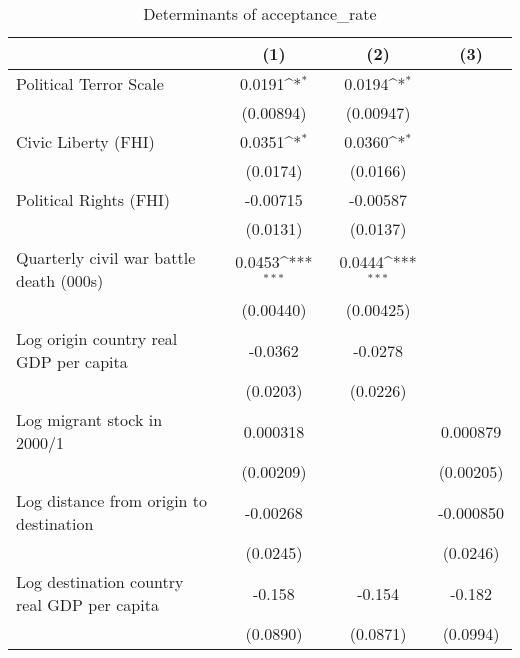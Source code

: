\begin{table}[htbp]\centering
\def\sym#1{\ifmmode^{#1}\else\(^{#1}\)\fi}
\caption{Determinants of acceptance\_rate}
\begin{tabular}{l*{3}{c}}
\hline\hline
                    &\multicolumn{1}{c}{(1)}         &\multicolumn{1}{c}{(2)}         &\multicolumn{1}{c}{(3)}         \\
\hline
Political Terror Scale&      0.0191\sym{*}  &      0.0194\sym{*}  &                     \\
                    &   (0.00894)         &   (0.00947)         &                     \\
[1em]
Civic Liberty (FHI) &      0.0351\sym{*}  &      0.0360\sym{*}  &                     \\
                    &    (0.0174)         &    (0.0166)         &                     \\
[1em]
Political Rights (FHI)&    -0.00715         &    -0.00587         &                     \\
                    &    (0.0131)         &    (0.0137)         &                     \\
[1em]
Quarterly civil war battle death (000s)&      0.0453\sym{***}&      0.0444\sym{***}&                     \\
                    &   (0.00440)         &   (0.00425)         &                     \\
[1em]
Log origin country real GDP per capita&     -0.0362         &     -0.0278         &                     \\
                    &    (0.0203)         &    (0.0226)         &                     \\
[1em]
Log migrant stock in 2000/1&    0.000318         &                     &    0.000879         \\
                    &   (0.00209)         &                     &   (0.00205)         \\
[1em]
Log distance from origin to destination&    -0.00268         &                     &   -0.000850         \\
                    &    (0.0245)         &                     &    (0.0246)         \\
[1em]
Log destination country real GDP per capita&      -0.158         &      -0.154         &      -0.182         \\
                    &    (0.0890)         &    (0.0871)         &    (0.0994)         \\

\end{tabular}
\end{table}
